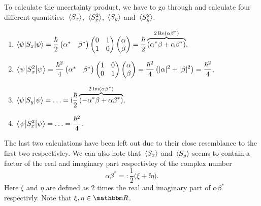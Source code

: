 \documentclass[11pt,letter, swedish, english
]{article}
\begin{document}
To calculate the uncertainty product, we have to go through and
calculate four different quantities: $\ev*{S_x}$, $\ev*{S_x^2}$, 
$\ev*{S_y}$ and $\ev*{S_y^2}$.
\begin{enumerate}[label=(\roman*)]
\item $\displaystyle{ 
\ev**{S_x}{\psi} = \frac{\hbar}{2} 
\begin{pmatrix}\alpha^*&\beta^*\end{pmatrix}
\begin{pmatrix}0&1\\1&0\end{pmatrix}
\begin{pmatrix}\alpha\\\beta\end{pmatrix}
= \frac{\hbar}{2} \overbrace{\left(\alpha^*\beta + \alpha\beta^*\right)}^{2\Re(\alpha\beta^*)},
}$
\item $\displaystyle{ 
\ev**{S_x^2}{\psi} = \frac{\hbar^2}{4} 
\begin{pmatrix}\alpha^*&\beta^*\end{pmatrix}
\begin{pmatrix}1&0 \\ 0&1\end{pmatrix}
\begin{pmatrix}\alpha \\ \beta\end{pmatrix}
= \frac{\hbar^2}{4} \left( |\alpha|^2+|\beta|^2 \right) 
= \frac{\hbar^2}{4},
}$
\item $\displaystyle{ 
\ev**{S_y}{\psi} = \ldots 
=\ii\frac{\hbar}{2}\overbrace{\left(-\alpha^*\beta + \alpha\beta^*\right)}^{2\Im(\alpha\beta^*)},
}$
\item $\displaystyle{ 
\ev**{S_x^2}{\psi} = \ldots = \frac{\hbar^2}{4}.
}$
\end{enumerate}
The last two calculations have been left out due to their close
resemblance to the first two respectivley. We can also note that
$\ev*{S_x}$ and $\ev*{S_y}$ seems to contain a factor of the real and
imaginary part respectivley of the complex number
\begin{equation}
\alpha\beta^*=:\frac{1}{2} \big(\xi+\ii\eta\big).
\end{equation}
Here $\xi$ and $\eta$ are defined as 2 times the real and imaginary
part of $\alpha\beta^*$ respectivly. Note that $\xi, \eta \in\R$.
\end{document}
